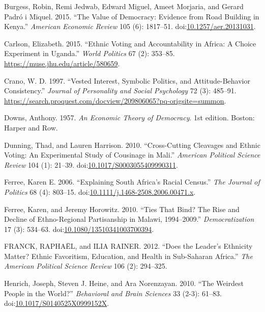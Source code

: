 \documentclass[]{article}
\begin{document}
\hypertarget{ref-burgess_value_2015}{}
Burgess, Robin, Remi Jedwab, Edward Miguel, Ameet Morjaria, and Gerard
Padró i Miquel. 2015. ``The Value of Democracy: Evidence from Road
Building in Kenya.'' \emph{American Economic Review} 105 (6): 1817--51.
doi:\href{https://doi.org/10.1257/aer.20131031}{10.1257/aer.20131031}.

\hypertarget{ref-carlson_ethnic_2015}{}
Carlson, Elizabeth. 2015. ``Ethnic Voting and Accountability in Africa:
A Choice Experiment in Uganda.'' \emph{World Politics} 67 (2): 353--85.
\url{https://muse.jhu.edu/article/580659}.

\hypertarget{ref-crano_vested_1997}{}
Crano, W. D. 1997. ``Vested Interest, Symbolic Politics, and
Attitude-Behavior Consistency.'' \emph{Journal of Personality and Social
Psychology} 72 (3): 485--91.
\url{https://search.proquest.com/docview/209806065?pq-origsite=summon}.

\hypertarget{ref-downs_economic_1957}{}
Downs, Anthony. 1957. \emph{An Economic Theory of Democracy}. 1st
edition. Boston: Harper and Row.

\hypertarget{ref-dunning_cross-cutting_2010}{}
Dunning, Thad, and Lauren Harrison. 2010. ``Cross-Cutting Cleavages and
Ethnic Voting: An Experimental Study of Cousinage in Mali.''
\emph{American Political Science Review} 104 (1): 21--39.
doi:\href{https://doi.org/10.1017/S0003055409990311}{10.1017/S0003055409990311}.

\hypertarget{ref-ferree_explaining_2006}{}
Ferree, Karen E. 2006. ``Explaining South Africa's Racial Census.''
\emph{The Journal of Politics} 68 (4): 803--15.
doi:\href{https://doi.org/10.1111/j.1468-2508.2006.00471.x}{10.1111/j.1468-2508.2006.00471.x}.

\hypertarget{ref-ferree_ties_2010}{}
Ferree, Karen, and Jeremy Horowitz. 2010. ``Ties That Bind? The Rise and
Decline of Ethno-Regional Partisanship in Malawi, 1994--2009.''
\emph{Democratization} 17 (3): 534--63.
doi:\href{https://doi.org/10.1080/13510341003700394}{10.1080/13510341003700394}.

\hypertarget{ref-franck_does_2012}{}
FRANCK, RAPHAËL, and ILIA RAINER. 2012. ``Does the Leader's Ethnicity
Matter? Ethnic Favoritism, Education, and Health in Sub-Saharan
Africa.'' \emph{The American Political Science Review} 106 (2):
294--325.

\hypertarget{ref-henrich_weirdest_2010}{}
Henrich, Joseph, Steven J. Heine, and Ara Norenzayan. 2010. ``The
Weirdest People in the World?'' \emph{Behavioral and Brain Sciences} 33
(2-3): 61--83.
doi:\href{https://doi.org/10.1017/S0140525X0999152X}{10.1017/S0140525X0999152X}.
\end{document}
